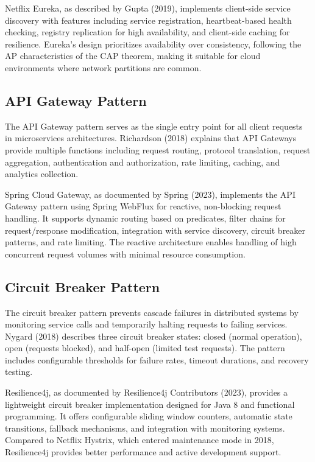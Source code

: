 Netflix Eureka, as described by Gupta (2019), implements client-side service discovery with features including service registration, heartbeat-based health checking, registry replication for high availability, and client-side caching for resilience. Eureka's design prioritizes availability over consistency, following the AP characteristics of the CAP theorem, making it suitable for cloud environments where network partitions are common.

\subsection{API Gateway Pattern}

The API Gateway pattern serves as the single entry point for all client requests in microservices architectures. Richardson (2018) explains that API Gateways provide multiple functions including request routing, protocol translation, request aggregation, authentication and authorization, rate limiting, caching, and analytics collection.

Spring Cloud Gateway, as documented by Spring (2023), implements the API Gateway pattern using Spring WebFlux for reactive, non-blocking request handling. It supports dynamic routing based on predicates, filter chains for request/response modification, integration with service discovery, circuit breaker patterns, and rate limiting. The reactive architecture enables handling of high concurrent request volumes with minimal resource consumption.

\subsection{Circuit Breaker Pattern}

The circuit breaker pattern prevents cascade failures in distributed systems by monitoring service calls and temporarily halting requests to failing services. Nygard (2018) describes three circuit breaker states: closed (normal operation), open (requests blocked), and half-open (limited test requests). The pattern includes configurable thresholds for failure rates, timeout durations, and recovery testing.

Resilience4j, as documented by Resilience4j Contributors (2023), provides a lightweight circuit breaker implementation designed for Java 8 and functional programming. It offers configurable sliding window counters, automatic state transitions, fallback mechanisms, and integration with monitoring systems. Compared to Netflix Hystrix, which entered maintenance mode in 2018, Resilience4j provides better performance and active development support.


